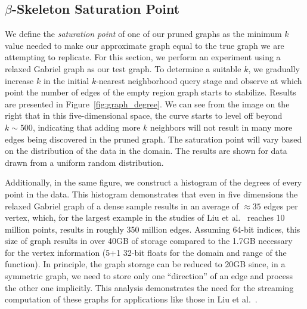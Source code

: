 \subsection{$\beta$-Skeleton Saturation Point}

We define the \textit{saturation point} of one of our pruned graphs as the minimum $k$ value needed to make our approximate graph equal to the true graph we are attempting to replicate.
%
For this section, we perform an experiment using a relaxed Gabriel graph as our test graph.
%
To determine a suitable $k$, we gradually increase $k$ in the initial $k$-nearest neighborhood query stage and observe at which point the number of edges of the empty region graph starts to stabilize.
%
Results are presented in Figure~\ref{fig:graph_degree}.
%
We can see from the image on the right that in this five-dimensional space, the curve starts to level off beyond $k\sim500$, indicating that adding more $k$ neighbors will not result in many more edges being discovered in the pruned graph.
%
The saturation point will vary based on the distribution of the data in the domain.
%
The results are shown for data drawn from a uniform random distribution.

Additionally, in the same figure, we construct a histogram of the degrees of every point in the data.
%
This histogram demonstrates that even in five dimensions the relaxed Gabriel graph of a dense sample results in an average of $\approx35$ edges per vertex, which, for the largest example in the studies of Liu et al.~\cite{LiuWangMaljovec2019} reaches 10 million points, results in roughly 350 million edges.
%
Assuming 64-bit indices, this size of graph results in over 40GB of storage compared to the 1.7GB necessary for the vertex information (5+1 32-bit floats for the domain and range of the function).
%
In principle, the graph storage can be reduced to 20GB since, in a symmetric graph, we need to store only one ``direction'' of an edge and process the other one implicitly.
%
This analysis demonstrates the need for the streaming computation of these graphs for applications like those in Liu et al.~\cite{LiuWangMaljovec2019}.

